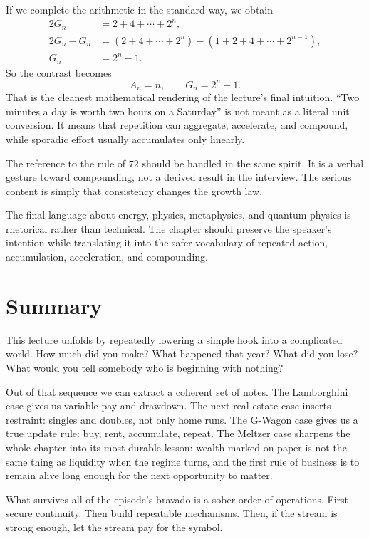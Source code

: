 If we complete the arithmetic in the standard way, we obtain
\begin{align}
2G_n &= 2+4+\cdots+2^n,\\
2G_n-G_n &= (2+4+\cdots+2^n)-(1+2+4+\cdots+2^{n-1}),\\
G_n &= 2^n-1.
\end{align}
So the contrast becomes
\[
A_n=n,
\qquad
G_n=2^n-1.
\]
That is the cleanest mathematical rendering of the lecture's final intuition. ``Two minutes a day is worth two hours on a Saturday'' is not meant as a literal unit conversion. It means that repetition can aggregate, accelerate, and compound, while sporadic effort usually accumulates only linearly.

The reference to the rule of \(72\) should be handled in the same spirit. It is a verbal gesture toward compounding, not a derived result in the interview. The serious content is simply that consistency changes the growth law.

\begin{remark}
The final language about energy, physics, metaphysics, and quantum physics is rhetorical rather than technical. The chapter should preserve the speaker's intention while translating it into the safer vocabulary of repeated action, accumulation, acceleration, and compounding.
\end{remark}

\section{Summary}

This lecture unfolds by repeatedly lowering a simple hook into a complicated world. How much did you make? What happened that year? What did you lose? What would you tell somebody who is beginning with nothing?

Out of that sequence we can extract a coherent set of notes. The Lamborghini case gives us variable pay and drawdown. The next real-estate case inserts restraint: singles and doubles, not only home runs. The G-Wagon case gives us a true update rule: buy, rent, accumulate, repeat. The Meltzer case sharpens the whole chapter into its most durable lesson: wealth marked on paper is not the same thing as liquidity when the regime turns, and the first rule of business is to remain alive long enough for the next opportunity to matter.

What survives all of the episode's bravado is a sober order of operations. First secure continuity. Then build repeatable mechanisms. Then, if the stream is strong enough, let the stream pay for the symbol.
